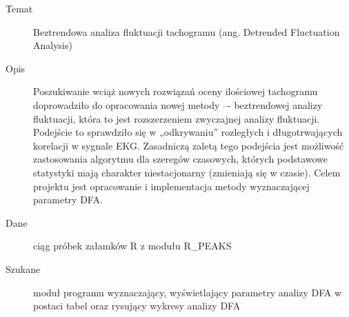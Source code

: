 \documentclass[a4paper, 11pt]{article}
\begin{document}
\begin{description}
\item[Temat] Beztrendowa analiza fluktuacji tachogramu (ang. Detrended Fluctuation Analysis)
\item[Opis] Poszukiwanie wciąż nowych rozwiązań oceny ilościowej tachogramu doprowadziło do
opracowania nowej metody –- beztrendowej analizy fluktuacji, która to jest rozszerzeniem
zwyczajnej analizy fluktuacji. Podejście to sprawdziło się w „odkrywaniu” rozległych
i długotrwających korelacji w sygnale EKG. Zasadniczą zaletą tego podejścia jest możliwość
zastosowania algorytmu dla szeregów czasowych, których podstawowe statystyki mają
charakter niestacjonarny (zmieniają się w czasie). Celem projektu jest opracowanie
i implementacja metody wyznaczającej parametry DFA.
\item[Dane] ciąg próbek załamków R z modułu R\_PEAKS
\item[Szukane] moduł programu wyznaczający, wyświetlający parametry analizy DFA w postaci
tabel oraz rysujący wykresy analizy DFA
\end{description}
\end{document}
